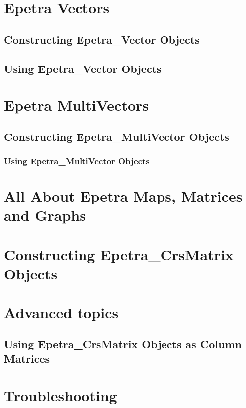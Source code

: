 \documentclass[12pt,relax]{EpetraUserGuide}
\renewcommand{\vector}{Epetra\_Vector}
\newcommand{\multivector}{Epetra\_MultiVector}
\newcommand{\crsmatrix}{Epetra\_CrsMatrix}
\begin{document}
\section{Epetra Vectors}
\subsection{Constructing \vector{} Objects}
\subsection{Using \vector{} Objects}
\section{Epetra MultiVectors}
\subsection{Constructing \multivector{} Objects}
\subsubsection{Using \multivector{} Objects}
\section{All About Epetra Maps, Matrices and Graphs}
\label{Section:MapsAndMatrices}

\section{Constructing \crsmatrix{} Objects}
\label{Section:ConstructingCrsMatrices}


\section{ Advanced topics}
\subsection {Using \crsmatrix{} Objects as Column Matrices}

\clearpage



\appendix
\section{Troubleshooting}
\label{Section:Troubleshooting}
\end{document}
